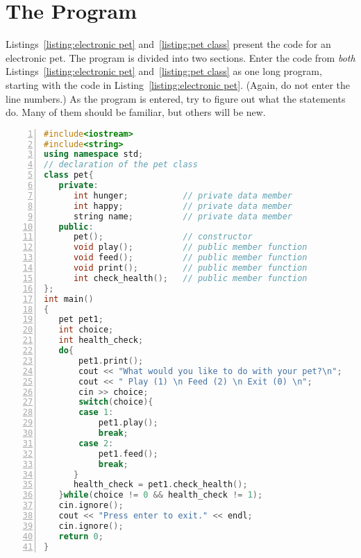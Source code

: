 
\section{The Program}

Listings~\ref{listing:electronic pet} and~\ref{listing:pet class} present the code for an electronic pet.  The program is divided into two sections.  Enter the code from \emph{both} Listings~\ref{listing:electronic pet} and~\ref{listing:pet class} as one long program, starting with the code in Listing~\ref{listing:electronic pet}.  (Again, do not enter the line numbers.)  As the program is entered, try to figure out what the statements do.  Many of them should be familiar, but others will be new.

\begin{minipage}{\textwidth}
\begin{lstlisting}[language=C++,numbers = left, xleftmargin=4.0ex, basicstyle=\small,emph={hunger, happy,name,pet1,choice,health_check},emphstyle = \color{\mycolor},
showstringspaces=false,
caption = {The \codefont{main()} and the declaration of the \cf{pet} class.},
label={listing:electronic pet}]
#include<iostream>
#include<string>
using namespace std;
// declaration of the pet class
class pet{
   private:
      int hunger;           // private data member
      int happy;            // private data member
      string name;          // private data member
   public:
      pet();                // constructor
      void play();          // public member function
      void feed();          // public member function
      void print();         // public member function
      int check_health();   // public member function
};
int main()
{
   pet pet1;
   int choice;
   int health_check;
   do{
       pet1.print();
       cout << "What would you like to do with your pet?\n";
       cout << " Play (1) \n Feed (2) \n Exit (0) \n";
       cin >> choice;
       switch(choice){
       case 1:
           pet1.play();
           break;
       case 2:
           pet1.feed();
           break;
      }
      health_check = pet1.check_health();
   }while(choice != 0 && health_check != 1);
   cin.ignore();
   cout << "Press enter to exit." << endl;
   cin.ignore();
   return 0;
}
\end{lstlisting}
\end{minipage}

